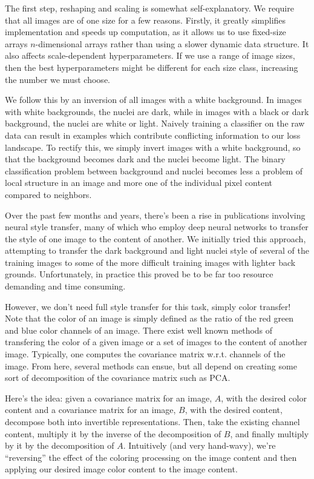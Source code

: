 \documentclass[paper=letter, fontsize=12pt]{article}
\numberwithin{equation}{section} %
\numberwithin{figure}{section} %
\numberwithin{table}{section} %
\begin{document}
The first step, reshaping and scaling is somewhat self-explanatory.  We require
that all images are of one size for a few reasons.  Firstly, it greatly
simplifies implementation and speeds up computation, as it allows us to use
fixed-size arrays $n$-dimensional arrays rather than using a slower dynamic
data structure.  It also affects scale-dependent hyperparameters.  If we use a
range of image sizes, then the best hyperparameters might be different for each
size class, increasing the number we must choose.

We follow this by an inversion of all images with a white background.  In
images with white backgrounds, the nuclei are dark, while in images with a
black or dark background, the nuclei are white or light.  Naively training a
classifier on the raw data can result in examples which contribute conflicting
information to our loss landscape.  To rectify this, we simply invert images
with a white background, so that the background becomes dark and the nuclei
become light.  The binary classification problem between background and nuclei
becomes less a problem of local structure in an image and more one of
the individual pixel content compared to neighbors.

Over the past few months and years, there's been a rise in publications
involving neural style transfer, many of which who employ deep neural networks
to transfer the style of one image to the content of another. We initially
tried this approach, attempting to transfer the dark background and light
nuclei style of several of the training images to some of the more difficult
training images with lighter back grounds. Unfortunately, in practice this
proved be to be far too resource demanding and time consuming.

However, we don't need full style transfer for this task, simply color
transfer! Note that the color of an image is simply defined as the ratio of the
red green and blue color channels of an image. There exist well known methods
of transfering the color of a given image or a set of images to the content of
another image.  Typically, one computes the covariance matrix w.r.t. channels
of the image.  From here, several methods can ensue, but all depend on creating
some sort of decomposition of the covariance matrix such as PCA.

Here's the idea: given a covariance matrix for an image, $A$, with the desired
color content and a covariance matrix for an image, $B$, with the desired
content, decompose both into invertible representations. Then, take the
existing channel content, multiply it by the inverse of the decomposition of
$B$, and finally multiply by it by the decomposition of $A$. Intuitively (and
very hand-wavy), we're ``reversing'' the effect of the coloring processing on
the image content and then applying our desired image color content to the
image content.
\end{document}
